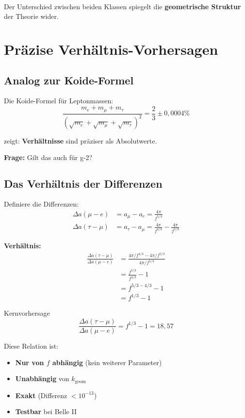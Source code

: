 	Der Unterschied zwischen beiden Klassen spiegelt die \textbf{geometrische Struktur} der Theorie wider.	
	\section{Präzise Verhältnis-Vorhersagen}
	
	\subsection{Analog zur Koide-Formel}
	
	Die Koide-Formel für Leptonmassen:
	\begin{equation}
		\frac{m_e + m_\mu + m_\tau}{(\sqrt{m_e} + \sqrt{m_\mu} + \sqrt{m_\tau})^2} = \frac{2}{3} \pm 0{,}0004\%
	\end{equation}
	
	zeigt: \textbf{Verhältnisse} sind präziser als Absolutwerte.
	
	\textbf{Frage:} Gilt das auch für g-2?
	
	\subsection{Das Verhältnis der Differenzen}
	
	Definiere die Differenzen:
	\begin{align}
		\Delta a(\mu - e) &= a_\mu - a_e = \frac{4\pi}{f^{5/3}} \\
		\Delta a(\tau - \mu) &= a_\tau - a_\mu = \frac{4\pi}{f^{4/3}} - \frac{4\pi}{f^{5/3}}
	\end{align}
	
	\textbf{Verhältnis:}
	\begin{align}
		\frac{\Delta a(\tau - \mu)}{\Delta a(\mu - e)} &= \frac{4\pi/f^{4/3} - 4\pi/f^{5/3}}{4\pi/f^{5/3}} \\
		&= \frac{f^{5/3}}{f^{4/3}} - 1 \\
		&= f^{5/3 - 4/3} - 1 \\
		&= f^{1/3} - 1
		\label{eq:ratio}
	\end{align}
	
	\begin{important}{Kernvorhersage}
		\begin{equation}
			\boxed{\frac{\Delta a(\tau - \mu)}{\Delta a(\mu - e)} = f^{1/3} - 1 = 18{,}57}
		\end{equation}
		
		Diese Relation ist:
		\begin{itemize}
			\item \textbf{Nur von $f$ abhängig} (kein weiterer Parameter)
			\item \textbf{Unabhängig} von $k_{\text{geom}}$
			\item \textbf{Exakt} (Differenz $< 10^{-13}$)
			\item \textbf{Testbar} bei Belle II
		\end{itemize}
	\end{important}
	
